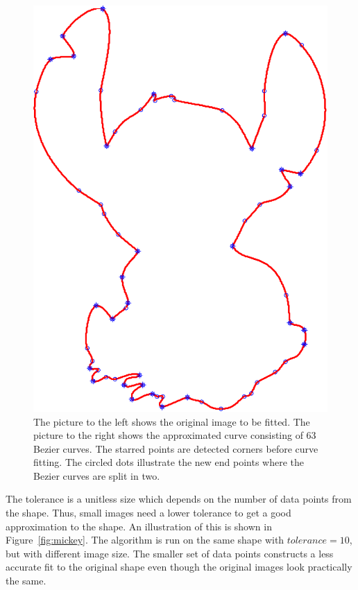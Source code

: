 \documentclass[10pt]{article}
\begin{document}
\begin{figure}
\begin{minipage}[t]{.5\textwidth}
    \includegraphics[scale=0.45]{figure5-crop.pdf}
\end{minipage}\hfill
\caption{The picture to the left shows the original image to be fitted. The picture to the right shows the approximated curve consisting of 63 Bezier curves. The starred points are detected corners before curve fitting. The circled dots illustrate the new end points where the Bezier curves are split in two.}
\label{fig:stitch}
\end{figure}

The tolerance is a unitless size which depends on the number of data points from the shape. Thus, small images need a lower tolerance to get a good approximation to the shape.  An illustration of this is shown in Figure~\ref{fig:mickey}. The algorithm is run on the same shape with $tolerance = 10$, but with different image size. The smaller set of data points constructs a less accurate fit to the original shape even though the original images look practically the same. 
\end{document}
